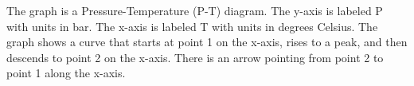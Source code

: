 The graph is a Pressure-Temperature (P-T) diagram. The y-axis is labeled P with units in bar. The x-axis is labeled T with units in degrees Celsius. The graph shows a curve that starts at point 1 on the x-axis, rises to a peak, and then descends to point 2 on the x-axis. There is an arrow pointing from point 2 to point 1 along the x-axis.